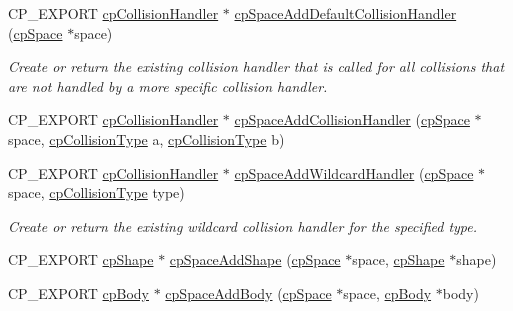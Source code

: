 \begin{DoxyCompactItemize}
\mbox{\label{group__cpSpace_gae6773756745d7889196ae14900b9752b}} 
C\+P\+\_\+\+E\+X\+P\+O\+RT \hyperlink{structcpCollisionHandler}{cp\+Collision\+Handler} $\ast$ \hyperlink{group__cpSpace_gae6773756745d7889196ae14900b9752b}{cp\+Space\+Add\+Default\+Collision\+Handler} (\hyperlink{structcpSpace}{cp\+Space} $\ast$space)
\begin{DoxyCompactList}\small\item\em Create or return the existing collision handler that is called for all collisions that are not handled by a more specific collision handler. \end{DoxyCompactList}\item 
C\+P\+\_\+\+E\+X\+P\+O\+RT \hyperlink{structcpCollisionHandler}{cp\+Collision\+Handler} $\ast$ \hyperlink{group__cpSpace_ga65edd7f02956f072b87daf7b42e61cf2}{cp\+Space\+Add\+Collision\+Handler} (\hyperlink{structcpSpace}{cp\+Space} $\ast$space, \hyperlink{group__basicTypes_gae83e2f50965eb441e36ffff1e32e6d02}{cp\+Collision\+Type} a, \hyperlink{group__basicTypes_gae83e2f50965eb441e36ffff1e32e6d02}{cp\+Collision\+Type} b)
\item 
\mbox{\label{group__cpSpace_ga75da454abaca74204a35d03d4f4ca5d8}} 
C\+P\+\_\+\+E\+X\+P\+O\+RT \hyperlink{structcpCollisionHandler}{cp\+Collision\+Handler} $\ast$ \hyperlink{group__cpSpace_ga75da454abaca74204a35d03d4f4ca5d8}{cp\+Space\+Add\+Wildcard\+Handler} (\hyperlink{structcpSpace}{cp\+Space} $\ast$space, \hyperlink{group__basicTypes_gae83e2f50965eb441e36ffff1e32e6d02}{cp\+Collision\+Type} type)
\begin{DoxyCompactList}\small\item\em Create or return the existing wildcard collision handler for the specified type. \end{DoxyCompactList}\item 
C\+P\+\_\+\+E\+X\+P\+O\+RT \hyperlink{structcpShape}{cp\+Shape} $\ast$ \hyperlink{group__cpSpace_gad5728f811290d821c009d1d07b62c06a}{cp\+Space\+Add\+Shape} (\hyperlink{structcpSpace}{cp\+Space} $\ast$space, \hyperlink{structcpShape}{cp\+Shape} $\ast$shape)
\item 
\mbox{\label{group__cpSpace_ga194141a199dd59d1387074aabc292280}} 
C\+P\+\_\+\+E\+X\+P\+O\+RT \hyperlink{structcpBody}{cp\+Body} $\ast$ \hyperlink{group__cpSpace_ga194141a199dd59d1387074aabc292280}{cp\+Space\+Add\+Body} (\hyperlink{structcpSpace}{cp\+Space} $\ast$space, \hyperlink{structcpBody}{cp\+Body} $\ast$body)

\end{DoxyCompactItemize}
